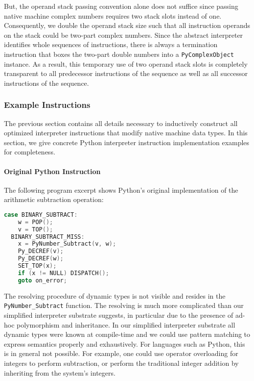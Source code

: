 \documentclass[preprint,10pt]{popl14conf}
\begin{document}
But, the operand stack passing convention alone does not suffice since passing native machine
complex numbers requires two stack slots instead of one.
Consequently, we double the operand stack size such that all instruction operands on the stack could
be two-part complex numbers.
Since the abstract interpreter identifies whole sequences of instructions, there is always a
termination instruction that boxes the two-part double numbers into a \texttt{PyComplexObject}
instance.
As a result, this temporary use of two operand stack slots is completely transparent to  all
predecessor instructions of the sequence as well as all successor instructions of the sequence.



\subsubsection{Example Instructions}\label{ss:examples}

The previous section contains all details necessary to inductively construct all optimized
interpreter instructions that modify native machine data types.
In this section, we give concrete Python interpreter instruction implementation examples for
completeness.

\paragraph{Original Python Instruction}

The following program excerpt shows Python's original implementation of the arithmetic subtraction
operation:
\begin{lstlisting}[language=C,style=othercode]
case BINARY_SUBTRACT:
    w = POP();
    v = TOP();
  BINARY_SUBTRACT_MISS:
    x = PyNumber_Subtract(v, w);
    Py_DECREF(v);
    Py_DECREF(w);
    SET_TOP(x);
    if (x != NULL) DISPATCH();
    goto on_error;
\end{lstlisting}
The resolving procedure of dynamic types is not visible and resides in the
\texttt{PyNumber_Subtract} function.
The resolving is much more complicated than our simplified interpreter substrate suggests, in
particular due to the presence of ad-hoc polymorphism and inheritance.
In our simplified interpreter substrate all dynamic types were known at compile-time and we could
use pattern matching to express semantics properly and exhaustively.
For languages such as Python, this is in general not possible.
For example, one could use operator overloading for integers to perform subtraction, or perform the
traditional integer addition by inheriting from the system's integers.
\end{document}
